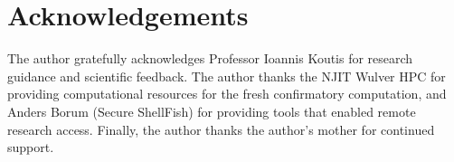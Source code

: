 \documentclass[preprint,12pt]{elsarticle}
\begin{document}
\section*{Acknowledgements}
The author gratefully acknowledges Professor Ioannis Koutis for research guidance and scientific feedback. The author thanks the NJIT Wulver HPC for providing computational resources for the fresh confirmatory computation, and Anders Borum (Secure ShellFish) for providing tools that enabled remote research access. Finally, the author thanks the author's mother for continued support.



{\raggedright

}
\end{document}
